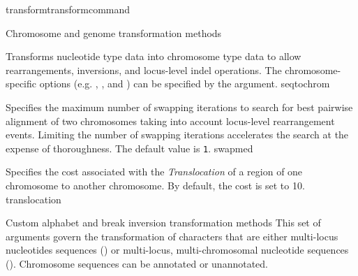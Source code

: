 \begin{command}{transform}{transformcommand}
\begin{arguments}
\begin{argumentgroup}{Chromosome and genome transformation methods}
\begin{description}
%             
{Transforms nucleotide type data into chromosome type data to allow
rearrangements, inversions, and locus-level indel operations. The
chromosome-specific options (e.g. , 
, %
and ) can be specified by the argument.}
{seqtochrom}

{Specifies the maximum number of swapping iterations
to search for best pairwise alignment of two chromosomes
taking into account locus-level rearrangement events. 
Limiting the number of swapping
iterations accelerates the search at the expense of
thoroughness. The default value is \texttt{1}.}
{swapmed}

{Specifies the cost associated with the \emph{Translocation} of a region of one 
chromosome to another chromosome. By default, the cost is set to 10.}
{translocation}

\end{description}
\end{argumentgroup}


\begin{argumentgroup}{Custom alphabet and break inversion transformation methods}  
This set of arguments govern the transformation of characters that are either multi-locus nucleotides 
sequences () or multi-locus, multi-chromosomal nucleotide
sequences (). Chromosome sequences can be \poyargument
{annotated} or unannotated.


\end{argumentgroup}
\end{arguments}
\end{command}

